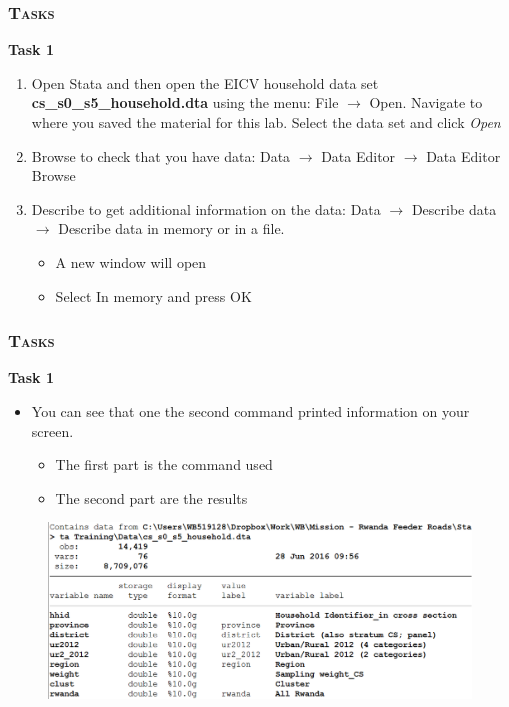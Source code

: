 \documentclass[10pt]{beamer}
\begin{document}
	\begin{frame}
		\frametitle{\textsc{Tasks}}
		\begin{center}
			\Large\textbf{Task 1}
		\end{center}
		\begin{enumerate}
			\item Open Stata and then open the EICV household data set \textbf{cs\_s0\_s5\_household.dta} using the menu: File $\rightarrow$ Open. Navigate to where you saved the material for this lab. Select the data set and click \textit{Open}
			\item Browse to check that you have data: Data  $\rightarrow$ Data Editor  $\rightarrow$ Data Editor Browse 
			\item Describe to get additional information on the data: Data  $\rightarrow$ Describe data $\rightarrow$ Describe data in memory or in a file.
			\begin{itemize}
				\item A new window will open
				\item Select In memory and press OK
			\end{itemize}
		\end{enumerate}
	\end{frame}

	\begin{frame}
		\frametitle{\textsc{Tasks}}
		\begin{center}
			\Large\textbf{Task 1}
		\end{center}
		\begin{itemize}
			\item You can see that one the second command printed information on your screen.
			\begin{itemize}
				\item The first part is the command used
				\item The second part are the results
			\end{itemize}
		\end{itemize}

		 \begin{figure}[H] 
				\centering
				\includegraphics[width=0.9\linewidth]{task1}
		\end{figure}
	\end{frame}
\end{document}
